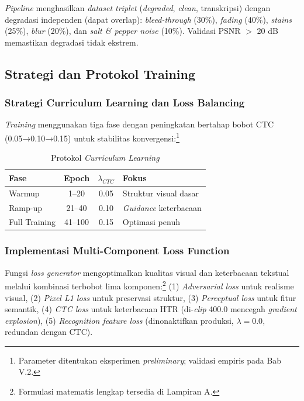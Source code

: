 \documentclass[12pt,a4paper]{book}
\begin{document}
\textit{Pipeline} menghasilkan \textit{dataset triplet} (\textit{degraded}, \textit{clean}, transkripsi) dengan degradasi independen (dapat overlap): \textit{bleed-through} (30\%), \textit{fading} (40\%), \textit{stains} (25\%), \textit{blur} (20\%), dan \textit{salt \& pepper noise} (10\%). Validasi PSNR $>$ 20 dB memastikan degradasi tidak ekstrem.

\subsection{Strategi dan Protokol Training}
\label{subsec:detail-implementasi-training}

\subsubsection{Strategi Curriculum Learning dan Loss Balancing}
\label{subsubsec:curriculum-learning-impl}

\textit{Training} menggunakan tiga fase dengan peningkatan bertahap bobot CTC (0.05→0.10→0.15) untuk stabilitas konvergensi:\footnote{Parameter ditentukan eksperimen \textit{preliminary}; validasi empiris pada Bab V.2.}

\begin{table}[H]
\centering
\caption{Protokol \textit{Curriculum Learning}}
\label{tab:curriculum-learning}
\small
\begin{tabular}{|l|c|c|l|}
\hline
\textbf{Fase} & \textbf{Epoch} & \textbf{$\lambda_{CTC}$} & \textbf{Fokus} \\
\hline
Warmup & 1--20 & 0.05 & Struktur visual dasar \\
Ramp-up & 21--40 & 0.10 & \textit{Guidance} keterbacaan \\
Full Training & 41--100 & 0.15 & Optimasi penuh \\
\hline
\end{tabular}
\end{table}

\subsubsection{Implementasi Multi-Component Loss Function}
\label{subsubsec:loss-implementasi}

Fungsi \textit{loss generator} mengoptimalkan kualitas visual dan keterbacaan tekstual melalui kombinasi terbobot lima komponen:\footnote{Formulasi matematis lengkap tersedia di Lampiran A.} (1) \textit{Adversarial loss} untuk realisme visual, (2) \textit{Pixel L1 loss} untuk preservasi struktur, (3) \textit{Perceptual loss} untuk fitur semantik, (4) \textit{CTC loss} untuk keterbacaan HTR (di-\textit{clip} 400.0 mencegah \textit{gradient explosion}), (5) \textit{Recognition feature loss} (dinonaktifkan produksi, $\lambda=0.0$, redundan dengan CTC).
\end{document}
